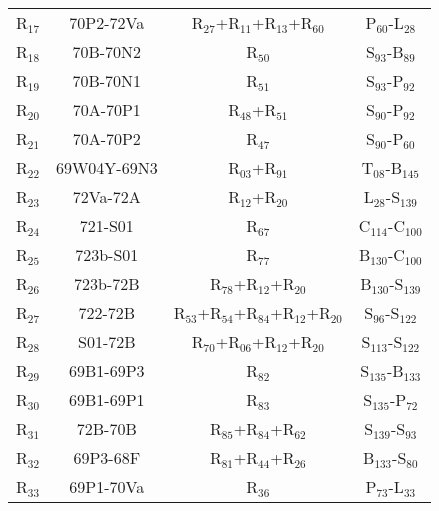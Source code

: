 \begin{table}[H]
{\begin{center}
{\begin{tabular}{ c c c c }
	
                    R$_{17}$ & 70P2-72Va & R$_{27}$+R$_{11}$+R$_{13}$+R$_{60}$ & P$_{60}$-L$_{28}$\\
                    R$_{18}$ & 70B-70N2 & R$_{50}$ & S$_{93}$-B$_{89}$\\
                    R$_{19}$ & 70B-70N1 & R$_{51}$ & S$_{93}$-P$_{92}$\\
                    R$_{20}$ & 70A-70P1 & R$_{48}$+R$_{51}$ & S$_{90}$-P$_{92}$\\
                    R$_{21}$ & 70A-70P2 & R$_{47}$ & S$_{90}$-P$_{60}$\\
                    R$_{22}$ & 69W04Y-69N3 & R$_{03}$+R$_{91}$ & T$_{08}$-B$_{145}$\\
                    R$_{23}$ & 72Va-72A & R$_{12}$+R$_{20}$ & L$_{28}$-S$_{139}$\\
                    R$_{24}$ & 721-S01 & R$_{67}$ & C$_{114}$-C$_{100}$\\
                    R$_{25}$ & 723b-S01 & R$_{77}$ & B$_{130}$-C$_{100}$\\
                    R$_{26}$ & 723b-72B & R$_{78}$+R$_{12}$+R$_{20}$ & B$_{130}$-S$_{139}$\\
                    R$_{27}$ & 722-72B & R$_{53}$+R$_{54}$+R$_{84}$+R$_{12}$+R$_{20}$ & S$_{96}$-S$_{122}$\\
                    R$_{28}$ & S01-72B & R$_{70}$+R$_{06}$+R$_{12}$+R$_{20}$ & S$_{113}$-S$_{122}$\\
                    R$_{29}$ & 69B1-69P3 & R$_{82}$ & S$_{135}$-B$_{133}$\\
                    R$_{30}$ & 69B1-69P1 & R$_{83}$ & S$_{135}$-P$_{72}$\\
                    R$_{31}$ & 72B-70B & R$_{85}$+R$_{84}$+R$_{62}$ & S$_{139}$-S$_{93}$\\
                    R$_{32}$ & 69P3-68F & R$_{81}$+R$_{44}$+R$_{26}$ &B$_{133}$-S$_{80}$\\
                    R$_{33}$ & 69P1-70Va & R$_{36}$ & P$_{73}$-L$_{33}$\\
                \hline
            \end{tabular}
            }
            \end{center}
        }    
    \end{table}
    
